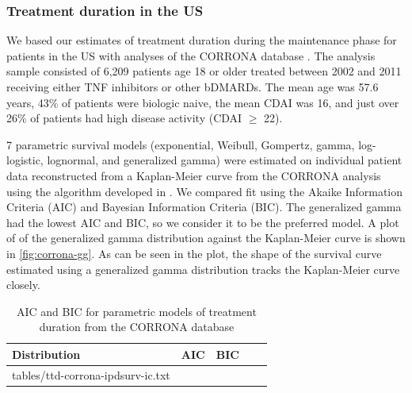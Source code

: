 \documentclass[11pt,final,fleqn]{article}\usepackage[]{graphicx}\usepackage[]{color}
\makeatletter
\theoremstyle{plain}
\newcommand*\ExpandableInput[1]{\@@input#1 }
\makeatother
\begin{document}
\subsubsection{Treatment duration in the US}\label{sec:ttd-overall}
We based our estimates of treatment duration during the maintenance phase for patients in the US with analyses of the CORRONA database \citep{strand2013op0064}. The analysis sample consisted of 6,209 patients age 18 or older treated between 2002 and 2011 receiving either TNF inhibitors or other bDMARDs. The mean age was 57.6 years, 43\% of patients were biologic naive, the mean CDAI was 16, and just over 26\% of patients had high disease activity (CDAI $\geq$ 22). 

7 parametric survival models (exponential, Weibull, Gompertz, gamma, log-logistic, lognormal, and generalized gamma) were estimated on individual patient data reconstructed from a Kaplan-Meier curve from the CORRONA analysis using the algorithm developed in \citet{guyot2012enhanced}. We compared fit using the Akaike Information Criteria (AIC) and Bayesian Information Criteria (BIC). The generalized gamma had the lowest AIC and BIC, so we consider it to be the preferred model. A plot of of the generalized gamma distribution against the Kaplan-Meier curve is shown in \autoref{fig:corrona-gg}. As can be seen in the plot, the shape of the survival curve estimated using a generalized gamma distribution tracks the Kaplan-Meier curve closely.  



\begin{table}[!ht]
\begin{center}
\begin{threeparttable}
\caption{AIC and BIC for parametric models of treatment duration from the CORRONA database} \label{tbl:ic-ttd-corrona}
\begin{tabularx}{\textwidth}{@{\extracolsep{\fill}}lcccc}
\hline
\multicolumn{1}{l}{Distribution} & \multicolumn{1}{c}{AIC} & \multicolumn{1}{c}{BIC}  \\
\hline
\ExpandableInput{tables/ttd-corrona-ipdsurv-ic.txt}
\hline
\end{tabularx}
\end{threeparttable}
\end{center}
\end{table}
\end{document}
